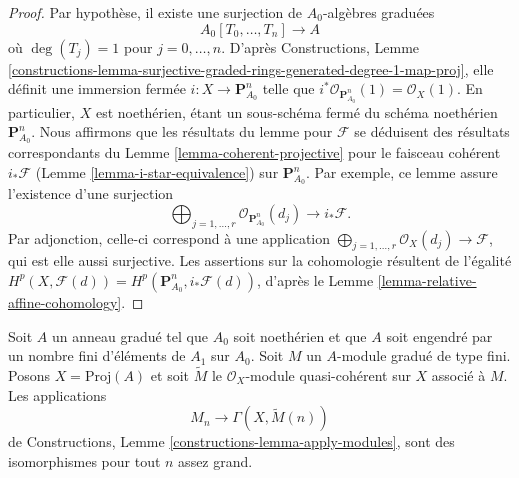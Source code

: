 \begin{proof}
Par hypothèse, il existe une surjection de $A_0$-algèbres graduées
$$
A_0[T_0, \ldots, T_n] \longrightarrow A
$$
où $\deg(T_j) = 1$ pour $j = 0, \ldots, n$. D'après Constructions, Lemme
\ref{constructions-lemma-surjective-graded-rings-generated-degree-1-map-proj},
elle définit une immersion fermée $i : X \to \mathbf{P}^n_{A_0}$
telle que $i^*\mathcal{O}_{\mathbf{P}^n_{A_0}}(1) = \mathcal{O}_X(1)$.
En particulier, $X$ est noethérien, étant un sous-schéma fermé du schéma
noethérien $\mathbf{P}^n_{A_0}$. Nous affirmons que les résultats du lemme pour
$\mathcal{F}$ se déduisent des résultats correspondants
du Lemme \ref{lemma-coherent-projective} pour le faisceau cohérent
$i_*\mathcal{F}$ (Lemme \ref{lemma-i-star-equivalence}) sur
$\mathbf{P}^n_{A_0}$. Par exemple, ce lemme assure
l'existence d'une surjection
$$
\bigoplus\nolimits_{j = 1, \ldots, r} \mathcal{O}_{\mathbf{P}^n_{A_0}}(d_j)
\longrightarrow i_*\mathcal{F}.
$$
Par adjonction, celle-ci correspond à une application
$\bigoplus_{j = 1, \ldots, r} \mathcal{O}_X(d_j) \longrightarrow \mathcal{F}$,
qui est elle aussi surjective. Les assertions sur la cohomologie résultent
de l'égalité
$H^p(X, \mathcal{F}(d)) = H^p(\mathbf{P}^n_{A_0}, i_*\mathcal{F}(d))$,
d'après le Lemme \ref{lemma-relative-affine-cohomology}.
\end{proof}

\begin{lemma}
\label{lemma-recover-tail-graded-module}
Soit $A$ un anneau gradué tel que $A_0$ soit noethérien et que $A$ soit engendré
par un nombre fini d'éléments de $A_1$ sur $A_0$. Soit $M$ un
$A$-module gradué de type fini. Posons $X = \text{Proj}(A)$ et soit $\widetilde{M}$
le $\mathcal{O}_X$-module quasi-cohérent sur $X$ associé à $M$.
Les applications
$$
M_n \longrightarrow \Gamma(X, \widetilde{M}(n))
$$
de Constructions, Lemme \ref{constructions-lemma-apply-modules},
sont des isomorphismes pour tout $n$ assez grand.
\end{lemma}

